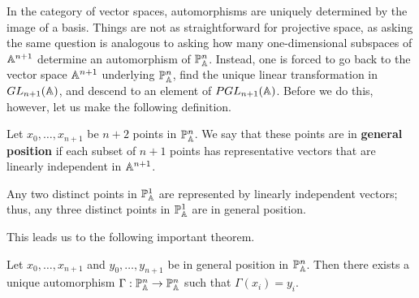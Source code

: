 \documentclass{../../mathnotes}
\begin{document}
In the category of vector spaces, automorphisms are uniquely determined by the image of a basis. Things are not as straightforward
for projective space, as asking the same question is analogous to asking how many one-dimensional subspaces of $\mathbb{A}^{n+1}$ determine
an automorphism of $\mathbb{P}^n_{\mathbb{A}}$. Instead, one is forced to go back to the vector space $\mathbb{A}^{n+1}$ underlying $\mathbb{P}^n_{\mathbb{A}}$, find
the unique linear transformation in $GL_{n+1}(\mathbb{A})$, and descend to an element of $PGL_{n+1}(\mathbb{A})$.
Before we do this, however, let us make the following definition.

\begin{defn}
    Let $x_0,\ldots, x_{n+1}$ be $n+2$ points in $\mathbb{P}^n_{\mathbb{A}}$. We say that these points are in \textbf{general position}
    if each subset of $n+1$ points has representative vectors that are linearly independent in $\mathbb{A}^{n+1}$.
\end{defn}

\begin{exmp}
    Any two distinct points in $\mathbb{P}^1_{\mathbb{A}}$ are represented by linearly independent vectors; thus, any three distinct points
    in $\mathbb{P}^1_{\mathbb{A}}$ are in general position.
\end{exmp}

This leads us to the following important theorem.

\begin{thm}
    Let $x_0,\ldots, x_{n+1}$ and $y_0,\ldots, y_{n+1}$ be in general position in $\mathbb{P}^n_{\mathbb{A}}$. Then there exists a unique
    automorphism $\Gamma:\mathbb{P}^n_{\mathbb{A}}\to\mathbb{P}^n_{\mathbb{A}}$ such that $\Gamma(x_i)=y_i$.
\end{thm}
\end{document}
